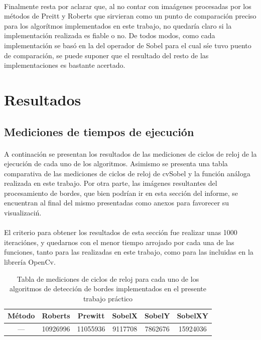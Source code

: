 \documentclass[11pt, a4paper]{article}
\begin{document}
\paragraph*{}
Finalmente resta por aclarar que, al no contar con ima\'agenes procesadas por los m\'etodos de Preitt y Roberts que sirvieran como un punto de comparaci\'on preciso para los algor\'itmos implementados en este trabajo, no quedar\'ia claro si la implementaci\'on realizada es fiable o no. De todos modos, como cada implementaci\'on se bas\'o en la del operador de Sobel para el cual s\' se tuvo puento de comparaci\'on, se puede suponer que el resultado del resto de las implementaciones es bastante acertado.


\newpage

\section{Resultados}

\subsection{Mediciones de tiempos de ejecuci\'on}
\paragraph{}
A continaci\'on se presentan los resultados de las mediciones de ciclos de reloj de la ejecuci\'on de cada uno de los algoritmos. Asimismo se presenta una tabla comparativa de las mediciones de ciclos de reloj de cvSobel y la funci\'on an\'aloga realizada en este trabajo.
Por otra parte, las im\'agenes resultantes del procesamiento de bordes, que bien podr\'ian ir en esta secci\'on del informe, se encuentran al final del mismo presentadas como anexos para favorecer su visualizaci\'n.

\paragraph{}
El criterio para obtener los resultados de esta secci\'on fue realizar unas 1000 iteraci\'ones, y quedarnos con el menor tiempo arrojado por cada una de las funciones, tanto para las realizadas en este trabajo, como para las incluidas en la librer\'ia OpenCv.

\vspace{1cm}

\begin{table}[ht] %
\centering %
\begin{tabular}{|c|c|c|c|c|c|}
\hline
M\'etodo & Roberts & Prewitt & SobelX & SobelY & SobelXY \\
\hline
--- & 10926996 & 11055936 & 9117708 & 7862676 & 15924036 \\
\hline
\end{tabular}

\caption{Tabla de mediciones de ciclos de reloj para cada uno de los algoritmos de detecci\'on de bordes implementados en el presente trabajo pr\'actico} %
\label{Tiempo metodos} %
\end{table}
\vspace{30pt}
\end{document}
